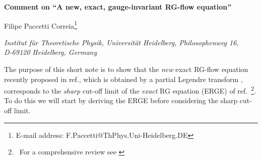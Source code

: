 \documentclass[a4paper,12pt]{article}
\begin{document}
\providecommand{\intx}{\int d^4 x\,}

\providecommand{\inty}{\int d^4 y\,}

\providecommand{\intk}{\int d^4 k\,}

\providecommand{\intp}{\int d^4 p\,}

\providecommand{\meio}{\frac{1}{2}}

\providecommand{\tr}{\,\text{tr}\,}

\begin{titlepage}


\begin{center}   
{\Large\bf
Comment on ``A new, exact, gauge-invariant RG-flow equation''}  
\end{center} 
\vspace{0.5cm} 
\begin{center} 
{\large Filipe \hspace{-0.07cm}Paccetti \hspace{-0.07cm}Correia\footnote{E-mail address: 
F.Paccetti@ThPhys.Uni-Heidelberg.DE}  
} 
\vspace{0.5cm}


{\em Institut f\"ur Theoretische Physik, Universit\"at Heidelberg,
Philosophenweg 16,\\
 D-69120 Heidelberg, Germany \\

} 

\end{center}

\vspace{1.0cm} 

\begin{abstract}
We show that the exact RG-flow equation introduced re\-cent\-ly in hep-th/ 0207134 can be obtained in the sharp cut-off limit of the well-known ERGE. This can be expected from the fact that in this limit the new scale-dependent effective action coincides with the one which is usually considered.  
\end{abstract}

\end{titlepage}

The purpose of this short note is to show that the \emph{new} exact RG-flow equation recently proposed in ref.\cite{Bra02}, which is obtained by a partial Legendre transform , corresponds to the \emph{sharp} cut-off limit of the \emph{exact} RG equation (ERGE) of ref.\cite{wet93,bon93}~\footnote{~For a comprehensive review see \cite{ber02}}. To do this we will start by deriving the ERGE before considering the sharp cut-off limit.
\end{document}
